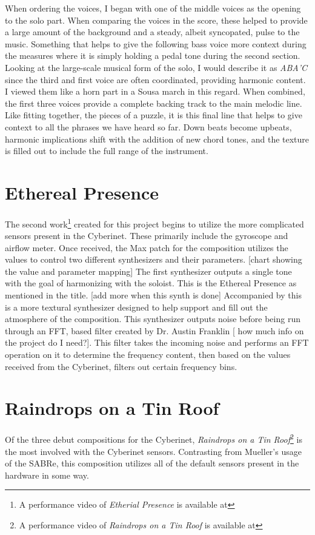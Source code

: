 When ordering the voices, I began with one of the middle voices as the opening to the solo part. When comparing the voices in the score, these helped to provide a large amount of the background and a steady, albeit syncopated, pulse to the music. Something that helps to give the following bass voice more context during the measures where it is simply holding a pedal tone during the second section. Looking at the large-scale musical form of the solo, I would describe it as \emph{ABA'C} since the third and first voice are often coordinated, providing harmonic content. I viewed them like a horn part in a Sousa march in this regard. When combined, the first three voices provide a complete backing track to the main melodic line. Like fitting together, the pieces of a puzzle, it is this final line that helps to give context to all the phrases we have heard so far. Down beats become upbeats, harmonic implications shift with the addition of new chord tones, and the texture is filled out to include the full range of the instrument.


\section{Ethereal Presence}
The second work\footnote{A performance video of \textit{Etherial Presence} is available at} created for this project begins to utilize the more complicated sensors present in the Cyberinet. These primarily include the gyroscope and airflow meter. Once received, the Max patch for the composition utilizes the values to control two different synthesizers and their parameters. 
[chart showing the value and parameter mapping]
The first synthesizer outputs a single tone with the goal of harmonizing with the soloist. This is the Ethereal Presence as mentioned in the title. [add more when this synth is done]
Accompanied by this is a more textural synthesizer designed to help support and fill out the atmosphere of the composition. This synthesizer outputs noise before being run through an FFT, based filter created by Dr. Austin Franklin [ how much info on the project do I need?]. This filter takes the incoming noise and performs an FFT operation on it to determine the frequency content, then based on the values received from the Cyberinet, filters out certain frequency bins. 


\section{Raindrops on a Tin Roof}
Of the three debut compositions for the Cyberinet, \textit{Raindrops on a Tin Roof}\footnote{A performance video of \textit{Raindrops on a Tin Roof} is available at} is the most involved with the Cyberinet sensors. Contrasting from Mueller's usage of the SABRe, this composition utilizes all of the default sensors present in the hardware in some way. 

